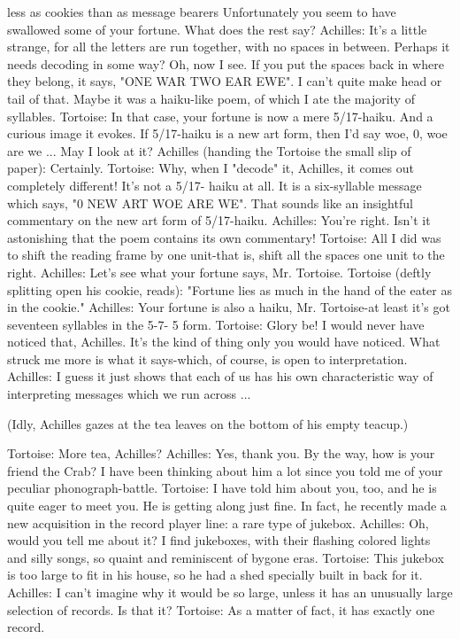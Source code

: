         less as cookies than as message bearers Unfortunately you seem to have swallowed some
       of your fortune. What does the rest say?
Achilles: It's a little strange, for all the letters are run together, with no spaces in between.
       Perhaps it needs decoding in some way? Oh, now I see. If you put the spaces back in
       where they belong, it says, "ONE WAR TWO EAR EWE". I can't quite make head or tail
       of that. Maybe it was a haiku-like poem, of which I ate the majority of syllables.
Tortoise: In that case, your fortune is now a mere 5/17-haiku. And a curious image it evokes. If
       5/17-haiku is a new art form, then I'd say woe, 0, woe are we ... May I look at it?
Achilles (handing the Tortoise the small slip of paper): Certainly.
Tortoise: Why, when I "decode" it, Achilles, it comes out completely different! It's not a 5/17-
       haiku at all. It is a six-syllable message which says, "0 NEW ART WOE ARE WE". That
       sounds like an insightful commentary on the new art form of 5/17-haiku.
Achilles: You're right. Isn't it astonishing that the poem contains its own commentary!
Tortoise: All I did was to shift the reading frame by one unit-that is, shift all the spaces one unit
       to the right.
Achilles: Let's see what your fortune says, Mr. Tortoise.
Tortoise (deftly splitting open his cookie, reads): "Fortune lies as much in the hand of the eater as
       in the cookie."
Achilles: Your fortune is also a haiku, Mr. Tortoise-at least it's got seventeen syllables in the 5-7-
       5 form.
Tortoise: Glory be! I would never have noticed that, Achilles. It's the kind of thing only you
       would have noticed. What struck me more is what it says-which, of course, is open to
       interpretation.
Achilles: I guess it just shows that each of us has his own characteristic way of interpreting
       messages which we run across ...

       (Idly, Achilles gazes at the tea leaves on the bottom of his empty teacup.)

Tortoise: More tea, Achilles?
Achilles: Yes, thank you. By the way, how is your friend the Crab? I have been thinking about
       him a lot since you told me of your peculiar phonograph-battle.
Tortoise: I have told him about you, too, and he is quite eager to meet you. He is getting along
       just fine. In fact, he recently made a new acquisition in the record player line: a rare type
       of jukebox.
Achilles: Oh, would you tell me about it? I find jukeboxes, with their flashing colored lights and
       silly songs, so quaint and reminiscent of bygone eras.
Tortoise: This jukebox is too large to fit in his house, so he had a shed specially built in back for
       it.
Achilles: I can't imagine why it would be so large, unless it has an unusually large selection of
       records. Is that it?
Tortoise: As a matter of fact, it has exactly one record.

